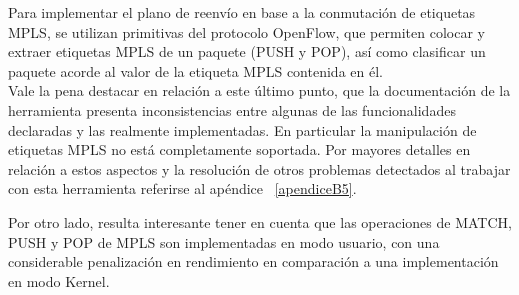 Para implementar el plano de reenvío en base a la conmutaci\'on de etiquetas MPLS, se utilizan primitivas del protocolo OpenFlow, que permiten colocar y extraer etiquetas MPLS de un paquete (PUSH y POP), así como clasificar un paquete acorde al valor de la etiqueta MPLS contenida en \'el.\\

Vale la pena destacar en relaci\'on a este \'ultimo punto, que la documentaci\'on de la herramienta presenta inconsistencias entre algunas de las funcionalidades declaradas y las realmente implementadas. En particular la manipulaci\'on de etiquetas MPLS no est\'a completamente soportada. Por mayores detalles en relaci\'on a estos aspectos y la resoluci\'on de otros problemas detectados al trabajar con esta herramienta referirse al ap\'endice ~\ref{apendiceB5}.
 


Por otro lado, resulta interesante tener en cuenta que las operaciones de MATCH, PUSH y POP de MPLS son implementadas en modo usuario, con una considerable penalizaci\'on en rendimiento en comparaci\'on a una implementaci\'on en modo Kernel.

